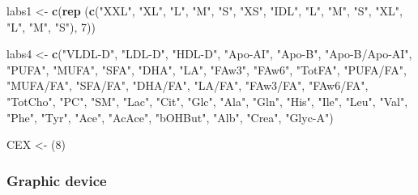\documentclass[
]{article}
\newenvironment{Shaded}{\begin{snugshade}}{\end{snugshade}}
\newcommand{\DecValTok}[1]{\textcolor[rgb]{0.00,0.00,0.81}{#1}}
\newcommand{\KeywordTok}[1]{\textcolor[rgb]{0.13,0.29,0.53}{\textbf{#1}}}
\newcommand{\NormalTok}[1]{#1}
\newcommand{\StringTok}[1]{\textcolor[rgb]{0.31,0.60,0.02}{#1}}
\begin{document}
\begin{Shaded}
\begin{Highlighting}[]
\NormalTok{labs1 <-}\StringTok{ }\KeywordTok{c}\NormalTok{(}\KeywordTok{rep}\NormalTok{ (}\KeywordTok{c}\NormalTok{(}\StringTok{"XXL"}\NormalTok{, }\StringTok{"XL"}\NormalTok{, }\StringTok{"L"}\NormalTok{, }\StringTok{"M"}\NormalTok{, }\StringTok{"S"}\NormalTok{, }\StringTok{"XS"}\NormalTok{, }\StringTok{"IDL"}\NormalTok{, }\StringTok{"L"}\NormalTok{, }\StringTok{"M"}\NormalTok{, }\StringTok{"S"}\NormalTok{, }\StringTok{"XL"}\NormalTok{, }\StringTok{"L"}\NormalTok{, }\StringTok{"M"}\NormalTok{, }\StringTok{"S"}\NormalTok{), }\DecValTok{7}\NormalTok{))}

\NormalTok{labs4 <-}\StringTok{ }\KeywordTok{c}\NormalTok{(}\StringTok{"VLDL-D"}\NormalTok{, }\StringTok{"LDL-D"}\NormalTok{, }\StringTok{"HDL-D"}\NormalTok{, }\StringTok{"Apo-AI"}\NormalTok{, }\StringTok{"Apo-B"}\NormalTok{, }\StringTok{"Apo-B/Apo-AI"}\NormalTok{,}
           \StringTok{"PUFA"}\NormalTok{, }\StringTok{"MUFA"}\NormalTok{, }\StringTok{"SFA"}\NormalTok{, }\StringTok{"DHA"}\NormalTok{, }\StringTok{"LA"}\NormalTok{, }\StringTok{"FAw3"}\NormalTok{, }\StringTok{"FAw6"}\NormalTok{, }\StringTok{"TotFA"}\NormalTok{,}
           \StringTok{"PUFA/FA"}\NormalTok{, }\StringTok{"MUFA/FA"}\NormalTok{, }\StringTok{"SFA/FA"}\NormalTok{, }\StringTok{"DHA/FA"}\NormalTok{, }\StringTok{"LA/FA"}\NormalTok{, }\StringTok{"FAw3/FA"}\NormalTok{, }\StringTok{"FAw6/FA"}\NormalTok{,}
           \StringTok{"TotCho"}\NormalTok{, }\StringTok{"PC"}\NormalTok{, }\StringTok{"SM"}\NormalTok{,}
           \StringTok{"Lac"}\NormalTok{, }\StringTok{"Cit"}\NormalTok{, }\StringTok{"Glc"}\NormalTok{,}
           \StringTok{"Ala"}\NormalTok{, }\StringTok{"Gln"}\NormalTok{, }\StringTok{"His"}\NormalTok{, }\StringTok{"Ile"}\NormalTok{, }\StringTok{"Leu"}\NormalTok{, }\StringTok{"Val"}\NormalTok{, }\StringTok{"Phe"}\NormalTok{, }\StringTok{"Tyr"}\NormalTok{,}
           \StringTok{"Ace"}\NormalTok{, }\StringTok{"AcAce"}\NormalTok{, }\StringTok{"bOHBut"}\NormalTok{,}
           \StringTok{"Alb"}\NormalTok{, }\StringTok{"Crea"}\NormalTok{, }\StringTok{"Glyc-A"}\NormalTok{)}

\NormalTok{CEX <-}\StringTok{ }\NormalTok{(}\DecValTok{8}\NormalTok{)}
\end{Highlighting}
\end{Shaded}

\hypertarget{graphic-device}{%
\subsubsection{Graphic device}\label{graphic-device}}
\end{document}
